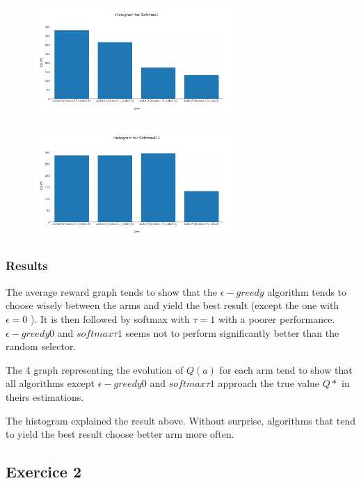 \documentclass[11pt]{article}
\begin{document}
\begin{figure}[H]
   \centering
   \includegraphics[width=0.7\textwidth]{img/1-1/h5.png}
\end{figure}

\begin{figure}[H]
   \centering
   \includegraphics[width=0.7\textwidth]{img/1-1/h6.png}
\end{figure}


\subsubsection{Results}

The average reward graph tends to show that the $\epsilon-greedy$ algorithm tends to choose wisely between the arms and yield the best result (except the one with $\epsilon = 0$ ). 
It is then followed by softmax with 
$\tau = 1$ 
with a poorer performance.
$ \epsilon -greedy 0$ 
and 
$softmax \tau 1$ 
seems not to perform significantly better than the random selector.

The 4 graph representing the evolution of $Q(a)$ for each arm tend to show that all algorithms except $ \epsilon-greedy 0$ and $ softmax \tau 1$ approach the true value $Q*$ in theirs estimations.

The histogram explained the result above. Without surprise, algorithms that tend to yield the best result choose better arm more often.

\subsection{Exercice 2}
\end{document}
